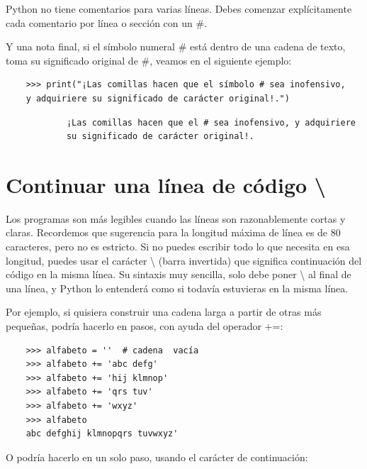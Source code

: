 Python no tiene comentarios para varias líneas. Debes comenzar explícitamente cada comentario por línea o sección con un {\ttfamily \#}.



Y una nota final, si el símbolo  numeral {\ttfamily  \#} está dentro de una cadena de texto, toma su significado original de {\ttfamily  \#}, veamos en el siguiente ejemplo:
\begin{lstlisting}
	>>> print("¡Las comillas hacen que el símbolo # sea inofensivo,
	y adquiriere su significado de carácter original!.")
\end{lstlisting}
{\ttfamily\scriptsize\scriptsize 
	\hspace{-0.65cm} \vspace{-0.3cm}	
	{\color{blue} 	
		\begin{verbatim}
			¡Las comillas hacen que el # sea inofensivo, y adquiriere 
			su significado de carácter original!. 			
		\end{verbatim}
}}


\section{Continuar una línea de código {\ttfamily \textbackslash}}


Los programas son más legibles cuando las líneas son razonablemente cortas y claras. Recordemos que sugerencia  para la longitud máxima de línea es de 80 caracteres, pero no es estricto. Si no puedes escribir todo lo que necesita en esa longitud, puedes usar el carácter {\ttfamily \textbackslash}  (barra invertida) que significa continuación del código  en la misma línea. Su sintaxis muy sencilla, solo debe poner   {\ttfamily \textbackslash}   al final de una línea, y Python lo entenderá como si todavía estuvieras en la misma línea.

Por ejemplo, si quisiera construir una cadena larga a partir de otras más pequeñas, podría hacerlo en pasos, con ayuda del operador {\ttfamily +=}:

\begin{lstlisting}
	>>> alfabeto = ''  # cadena  vacía
	>>> alfabeto += 'abc defg'
	>>> alfabeto += 'hij klmnop'
	>>> alfabeto += 'qrs tuv'
	>>> alfabeto += 'wxyz'
	>>> alfabeto 
	abc defghij klmnopqrs tuvwxyz'
\end{lstlisting}

O podría hacerlo en un solo paso, usando el carácter de continuación:

